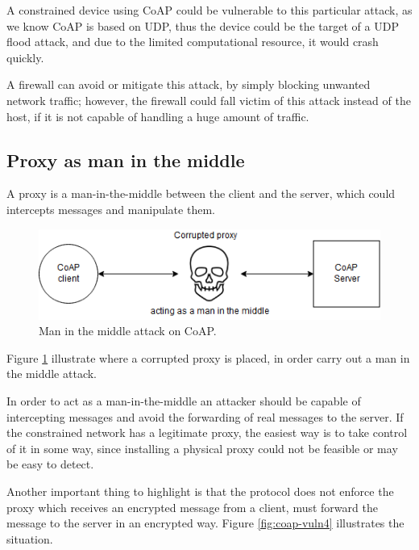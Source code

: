 	A constrained device using CoAP could be vulnerable to this particular attack, as we know CoAP is based on UDP, thus the device could be the target of a UDP flood attack, and due to the limited computational resource, it would crash quickly.\newline
	
	A firewall can avoid or mitigate this attack, by simply blocking unwanted network traffic; however, the firewall could fall victim of this attack instead of the host, if it is not capable of handling a huge amount of traffic.\newline
	
	\subsection{Proxy as man in the middle}
	A proxy is a man-in-the-middle between the client and the server, which could intercepts messages and manipulate them.
	
	\begin{figure}
		\includegraphics[width=\linewidth]{coap-vuln-img3.png}
		\caption{Man in the middle attack on CoAP.}
		\label{fig:coap-vuln3}
	\end{figure}
	
	Figure \ref{fig:coap-vuln3} illustrate where a corrupted proxy is placed, in order carry out a man in the middle attack.\newline
	
	In order to act as a man-in-the-middle an attacker should be capable of intercepting messages and avoid the forwarding of real messages to the server.\newline
	If the constrained network has a legitimate proxy, the easiest way is to take control of it in some way, since installing a physical proxy could not be feasible or may be easy to detect.\newline
	
	Another important thing to highlight is that the protocol does not enforce the proxy which receives an encrypted message from a client, must forward the message to the server in an encrypted way.
	Figure \ref{fig:coap-vuln4} illustrates the situation.\newline
	
